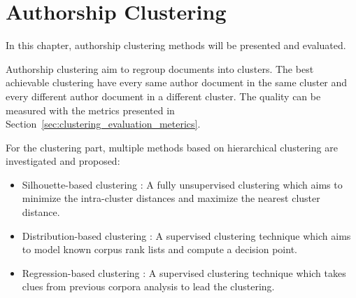 \chapter{Authorship Clustering \label{sec:clustering}}

In this chapter, authorship clustering methods will be presented and evaluated.

Authorship clustering aim to regroup documents into clusters.
The best achievable clustering have every same author document in the same cluster and every different author document in a different cluster.
The quality can be measured with the metrics presented in Section~\ref{sec:clustering_evaluation_meterics}.

For the clustering part, multiple methods based on hierarchical clustering are investigated and proposed:
\begin{itemize}
  \item
  Silhouette-based clustering : A fully unsupervised clustering which aims to minimize the intra-cluster distances and maximize the nearest cluster distance.
  \item
  Distribution-based clustering : A supervised clustering technique which aims to model known corpus rank lists and compute a decision point.
  \item
  Regression-based clustering : A supervised clustering technique which takes clues from previous corpora analysis to lead the clustering.
\end{itemize}






